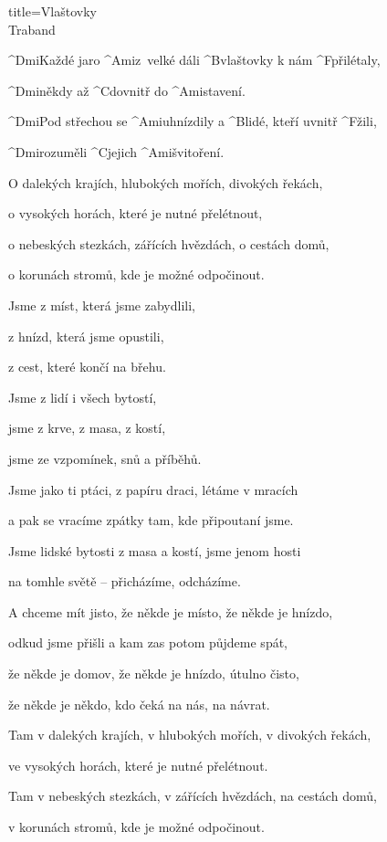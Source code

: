 \begin{song}{title=\predtitle\centering Vlaštovky \\\large Traband  \vspace*{-0.3cm}}  %
\begin{centerjustified}

\sloka 
	^{Dmi\z}Každé jaro ^{Ami\z}z~velké dáli ^{B\z }vlaštovky k nám ^{F\z }přilétaly,

	^{Dmi\z }někdy až ^{C\z }dovnitř do ^{\z Ami}stavení.

	^{Dmi}Pod střechou se ^{Ami\z }uhnízdily a ^{B\z }lidé, kteří uvnitř ^{F\z }žili,
	
	^{Dmi\z }rozuměli ^{C\z }jejich ^{\z Ami}švitoření.


\sloka 
	O dalekých krajích, hlubokých mořích, divokých řekách,

	o vysokých horách, které je nutné přelétnout,

	o nebeských stezkách, zářících hvězdách, o cestách domů,

	o korunách stromů, kde je možné odpočinout.


\sloka 
	Jsme z míst, která jsme zabydlili,

	z hnízd, která jsme opustili,

	z cest, které končí na břehu.

	Jsme z lidí i všech bytostí,

	jsme z krve, z masa, z kostí,

	jsme ze vzpomínek, snů a příběhů.


\sloka 
	Jsme jako ti ptáci, z papíru draci, létáme v mracích

	a pak se vracíme zpátky tam, kde připoutaní jsme.

	Jsme lidské bytosti z masa a kostí, jsme jenom hosti

	na tomhle světě -- přicházíme, odcházíme.


\sloka 
	A chceme mít jisto, že někde je místo, že někde je hnízdo,

	odkud jsme přišli a kam zas potom půjdeme spát,

	že někde je domov, že někde je hnízdo, útulno čisto,

	že někde je někdo, kdo čeká na nás, na návrat.


\sloka 
	Tam v dalekých krajích, v hlubokých mořích, v divokých řekách,

	ve vysokých horách, které je nutné přelétnout.

	Tam v nebeských stezkách, v zářících hvězdách, na cestách domů,

	v korunách stromů, kde je možné odpočinout.

\end{centerjustified}
\setcounter{Slokočet}{0}
\end{song}
